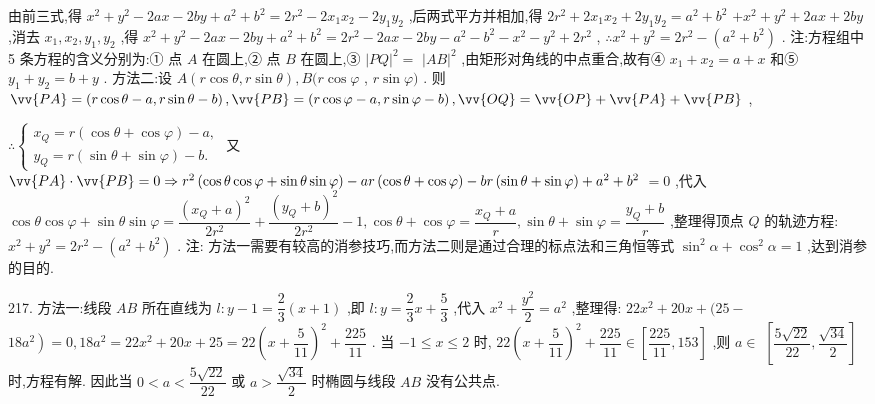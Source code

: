 由前三式,得 ${x}^{2} + {y}^{2} - {2ax} - {2by} + {a}^{2} + {b}^{2} = 2{r}^{2} - 2{x}_{1}{x}_{2} - 2{y}_{1}{y}_{2}$ ,后两式平方并相加,得 $2{r}^{2} + 2{x}_{1}{x}_{2} + 2{y}_{1}{y}_{2} = {a}^{2} + {b}^{2}$  $+ {x}^{2} + {y}^{2} + {2ax} + {2by}$ ,消去 ${x}_{1},{x}_{2},{y}_{1},{y}_{2}$ ,得 ${x}^{2} + {y}^{2} - {2ax} - {2by} + {a}^{2} + {b}^{2} = 2{r}^{2} - {2ax} - {2by} - {a}^{2} - {b}^{2} - {x}^{2} - {y}^{2} + 2{r}^{2}$ , $\therefore {x}^{2} + {y}^{2} = 2{r}^{2} - \left( {{a}^{2} + {b}^{2}}\right)$ . 注:方程组中 5 条方程的含义分别为:① 点 $A$ 在圆上,② 点 $B$ 在圆上,③ ${\left| PQ\right| }^{2} =$  ${\left| AB\right| }^{2}$ ,由矩形对角线的中点重合,故有④ ${x}_{1} + {x}_{2} = a + x$ 和⑤ ${y}_{1} + {y}_{2} = b + y$ . 方法二:设 $A\left( {r\cos \theta ,r\sin \theta }\right) ,B(r\cos \varphi$ , $r\sin \varphi )$ . 则 $\vv{PA} = \left( {r\cos \theta  - a,r\sin \theta  - b}\right) ,\vv{PB} = \left( {r\cos \varphi  - a,r\sin \varphi  - b}\right) ,\vv{OQ} = \vv{OP} + \vv{PA} + \vv{PB}$ ,

$\therefore \left\{  \begin{array}{l} {x}_{Q} = r\left( {\cos \theta  + \cos \varphi }\right)  - a, \\  {y}_{Q} = r\left( {\sin \theta  + \sin \varphi }\right)  - b. \end{array}\right.$ 又 $\vv{PA} \cdot  \vv{PB} = 0 \Rightarrow  {r}^{2}\left( {\cos \theta \cos \varphi  + \sin \theta \sin \varphi }\right)  - {ar}\left( {\cos \theta  + \cos \varphi }\right)  - {br}\left( {\sin \theta  + \sin \varphi }\right)  + {a}^{2} + {b}^{2}$  $= 0$ ,代入 $\cos \theta \cos \varphi  + \sin \theta \sin \varphi  = \dfrac{{\left( {x}_{Q} + a\right) }^{2}}{2{r}^{2}} + \dfrac{{\left( {y}_{Q} + b\right) }^{2}}{2{r}^{2}} - 1,\cos \theta  + \cos \varphi  = \dfrac{{x}_{Q} + a}{r},\sin \theta  + \sin \varphi  = \dfrac{{y}_{Q} + b}{r}$ ,整理得顶点 $Q$ 的轨迹方程: ${x}^{2} + {y}^{2} = 2{r}^{2} - \left( {{a}^{2} + {b}^{2}}\right)$ . 注: 方法一需要有较高的消参技巧,而方法二则是通过合理的标点法和三角恒等式 ${\sin }^{2}\alpha  + {\cos }^{2}\alpha  = 1$ ,达到消参的目的.

217. 方法一:线段 ${AB}$ 所在直线为 $l : y - 1 = \dfrac{2}{3}\left( {x + 1}\right)$ ,即 $l : y = \dfrac{2}{3}x + \dfrac{5}{3}$ ,代入 ${x}^{2} + \dfrac{{y}^{2}}{2} = {a}^{2}$ ,整理得: ${22}{x}^{2} + {20x} + ({25} -$  $\left. {{18}{a}^{2}}\right)  = 0,{18}{a}^{2} = {22}{x}^{2} + {20x} + {25} = {22}{\left( x + \dfrac{5}{11}\right) }^{2} + \dfrac{225}{11}$ . 当 $- 1 \leq  x \leq  2$ 时, ${22}{\left( x + \dfrac{5}{11}\right) }^{2} + \dfrac{225}{11} \in  \left\lbrack  {\dfrac{225}{11},{153}}\right\rbrack$ ,则 $a \in$  $\left\lbrack  {\dfrac{5\sqrt{22}}{22},\dfrac{\sqrt{34}}{2}}\right\rbrack$ 时,方程有解. 因此当 $0 < a < \dfrac{5\sqrt{22}}{22}$ 或 $a > \dfrac{\sqrt{34}}{2}$ 时椭圆与线段 ${AB}$ 没有公共点.

